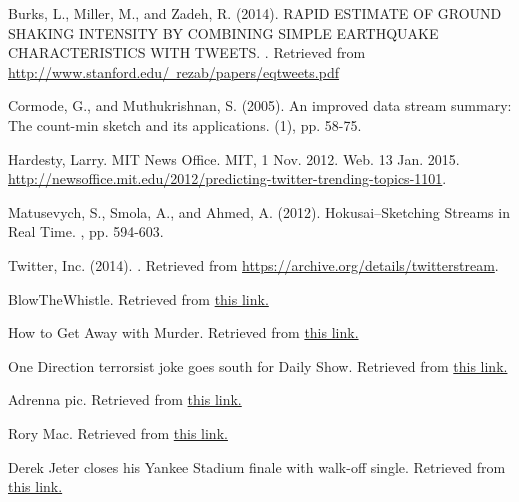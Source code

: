 \documentclass[twoside]{article}
\begin{document}
\begin{thebibliography}{99} %

Burks, L., Miller, M., and Zadeh, R. (2014). 
\newblock RAPID ESTIMATE OF GROUND SHAKING INTENSITY BY COMBINING SIMPLE EARTHQUAKE CHARACTERISTICS WITH TWEETS. 
. Retrieved from \href{http://www.stanford.edu/~rezab/papers/eqtweets.pdf}{http://www.stanford.edu/~rezab/papers/eqtweets.pdf}

Cormode, G., and Muthukrishnan, S. (2005). 
\newblock An improved data stream summary: The count-min sketch and its applications. 
(1), pp. 58-75.

Hardesty, Larry. 
\newblock MIT News Office. MIT, 1 Nov. 2012. Web. 13 Jan. 2015. \href{http://newsoffice.mit.edu/2012/predicting-twitter-trending-topics-1101}{http://newsoffice.mit.edu/2012/predicting-twitter-trending-topics-1101}.

Matusevych, S., Smola, A., and Ahmed, A. (2012).
\newblock Hokusai--Sketching Streams in Real Time.
, pp. 594-603.

Twitter, Inc. (2014). 
. 
\newblock Retrieved from \href{https://archive.org/details/twitterstream}{https://archive.org/details/twitterstream}.

\newblock BlowTheWhistle. Retrieved from \href{https://safesite.4agoodcause.com/curing-kids-cancer/donate/template_files/Blow_The_Whistle.jpg}{this link.}

 
\newblock How to Get Away with Murder.  Retrieved from \href{http://static.east.abc.go.com/service/image/index/id/65068ab1-d543-4958-a2cc-ee366bd807db/dim/600x800.jpg}{this link.}

 
\newblock One Direction terrorsist joke goes south for Daily Show.  Retrieved from \href{https://pbs.twimg.com/media/B52-mq-IQAEIqxz.jpg}{this link.}


\newblock Adrenna pic. Retrieved from \href{http://indiainf1.com/wp-content/uploads/2014/09/MRF-FF1600-BIC-28SEp2014-Adrenna-pic-300x184.jpg}{this link.}

 
\newblock Rory Mac.  Retrieved from \href{http://i.telegraph.co.uk/multimedia/archive/03050/rorymac_3050367b.jpg}{this link.}

\newblock Derek Jeter closes his Yankee Stadium finale with walk-off single.  Retrieved from \href{http://www.foxsports.com/mlb/story/derek-jeter-closes-yankee-stadium-finale-with-walk-off-single-new-york-yankees-beat-baltimore-orioles-092514}{this link.}
 
\end{thebibliography}

\end{document}
